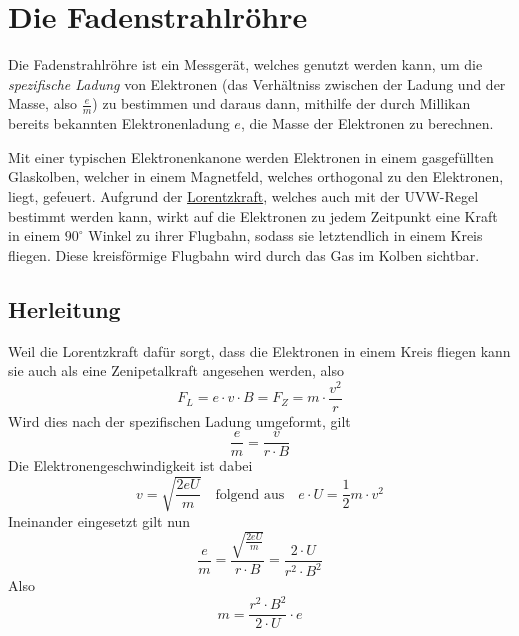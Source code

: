 \documentclass{article}
\begin{document}
\section{Die Fadenstrahlröhre} 
Die Fadenstrahlröhre ist ein Messgerät, welches genutzt werden kann, um die \emph{spezifische Ladung} von Elektronen (das Verhältniss zwischen der Ladung und der Masse, also $\frac{e}{m}$) zu bestimmen und daraus dann, mithilfe der durch Millikan bereits bekannten Elektronenladung $e$, die Masse der Elektronen zu berechnen.
 
Mit einer typischen Elektronenkanone werden Elektronen in einem gasgefüllten Glaskolben, welcher in einem Magnetfeld, welches orthogonal zu den Elektronen, liegt, gefeuert. Aufgrund der \hyperref[Lorentzkraft]{Lorentzkraft}, welches auch mit der UVW-Regel bestimmt werden kann, wirkt auf die Elektronen zu jedem Zeitpunkt eine Kraft in einem $90^\circ$ Winkel zu ihrer Flugbahn, sodass sie letztendlich in einem Kreis fliegen. Diese kreisförmige Flugbahn wird durch das Gas im Kolben sichtbar.
 
\subsection{Herleitung}%
Weil die Lorentzkraft dafür sorgt, dass die Elektronen in einem Kreis fliegen kann sie auch als eine Zenipetalkraft angesehen werden, also
\[
 F_L = e \cdot v \cdot B = F_Z = m \cdot \dfrac{v^2}{r}
\]
Wird dies nach der spezifischen Ladung umgeformt, gilt
\[
 \frac{e}{m} = \frac{v}{r \cdot B} 
\]
Die Elektronengeschwindigkeit ist dabei
\[
 v = \sqrt{\frac{2eU}{m}}
 \quad \text{folgend aus} \quad
 e \cdot U = \frac{1}{2} m \cdot v^2 
\]
Ineinander eingesetzt gilt nun
\[
 \frac{e}{m} = \frac{\sqrt{\frac{2eU}{m}}}{r \cdot B} = \frac{2 \cdot U}{r^2 \cdot B^2}
\]
Also
\[
 m = \frac{r^2 \cdot B^2}{2 \cdot U} \cdot e
\] 
\end{document}
